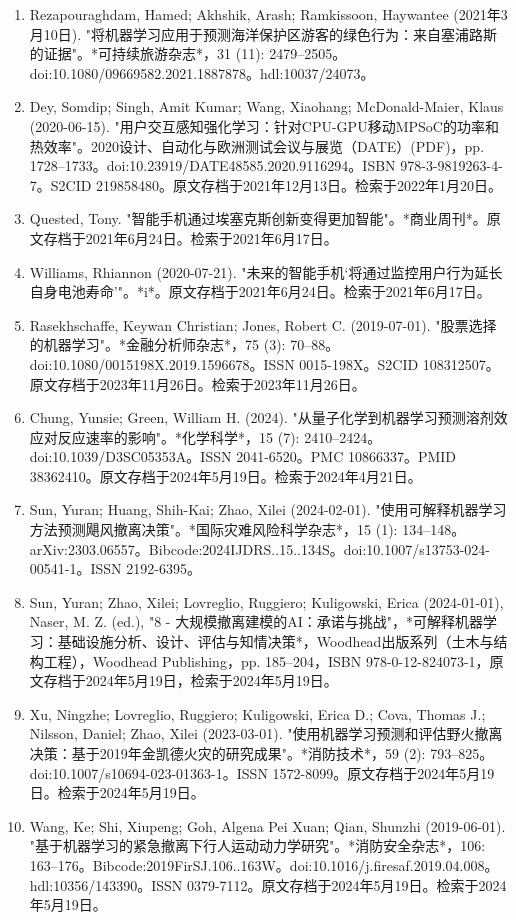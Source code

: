\begin{enumerate}
\item Rezapouraghdam, Hamed; Akhshik, Arash; Ramkissoon, Haywantee (2021年3月10日). "将机器学习应用于预测海洋保护区游客的绿色行为：来自塞浦路斯的证据"。*可持续旅游杂志*，31 (11): 2479–2505。doi:10.1080/09669582.2021.1887878。hdl:10037/24073。
\item Dey, Somdip; Singh, Amit Kumar; Wang, Xiaohang; McDonald-Maier, Klaus (2020-06-15). "用户交互感知强化学习：针对CPU-GPU移动MPSoC的功率和热效率"。2020设计、自动化与欧洲测试会议与展览（DATE）(PDF)，pp. 1728–1733。doi:10.23919/DATE48585.2020.9116294。ISBN 978-3-9819263-4-7。S2CID 219858480。原文存档于2021年12月13日。检索于2022年1月20日。
\item Quested, Tony. "智能手机通过埃塞克斯创新变得更加智能"。*商业周刊*。原文存档于2021年6月24日。检索于2021年6月17日。
\item Williams, Rhiannon (2020-07-21). "未来的智能手机‘将通过监控用户行为延长自身电池寿命’"。*i*。原文存档于2021年6月24日。检索于2021年6月17日。
\item Rasekhschaffe, Keywan Christian; Jones, Robert C. (2019-07-01). "股票选择的机器学习"。*金融分析师杂志*，75 (3): 70–88。doi:10.1080/0015198X.2019.1596678。ISSN 0015-198X。S2CID 108312507。原文存档于2023年11月26日。检索于2023年11月26日。
\item Chung, Yunsie; Green, William H. (2024). "从量子化学到机器学习预测溶剂效应对反应速率的影响"。*化学科学*，15 (7): 2410–2424。doi:10.1039/D3SC05353A。ISSN 2041-6520。PMC 10866337。PMID 38362410。原文存档于2024年5月19日。检索于2024年4月21日。
\item Sun, Yuran; Huang, Shih-Kai; Zhao, Xilei (2024-02-01). "使用可解释机器学习方法预测飓风撤离决策"。*国际灾难风险科学杂志*，15 (1): 134–148。arXiv:2303.06557。Bibcode:2024IJDRS..15..134S。doi:10.1007/s13753-024-00541-1。ISSN 2192-6395。
\item Sun, Yuran; Zhao, Xilei; Lovreglio, Ruggiero; Kuligowski, Erica (2024-01-01), Naser, M. Z. (ed.), "8 - 大规模撤离建模的AI：承诺与挑战"，*可解释机器学习：基础设施分析、设计、评估与知情决策*，Woodhead出版系列（土木与结构工程），Woodhead Publishing，pp. 185–204，ISBN 978-0-12-824073-1，原文存档于2024年5月19日，检索于2024年5月19日。
\item Xu, Ningzhe; Lovreglio, Ruggiero; Kuligowski, Erica D.; Cova, Thomas J.; Nilsson, Daniel; Zhao, Xilei (2023-03-01). "使用机器学习预测和评估野火撤离决策：基于2019年金凯德火灾的研究成果"。*消防技术*，59 (2): 793–825。doi:10.1007/s10694-023-01363-1。ISSN 1572-8099。原文存档于2024年5月19日。检索于2024年5月19日。
\item Wang, Ke; Shi, Xiupeng; Goh, Algena Pei Xuan; Qian, Shunzhi (2019-06-01). "基于机器学习的紧急撤离下行人运动动力学研究"。*消防安全杂志*，106: 163–176。Bibcode:2019FirSJ.106..163W。doi:10.1016/j.firesaf.2019.04.008。hdl:10356/143390。ISSN 0379-7112。原文存档于2024年5月19日。检索于2024年5月19日。

\end{enumerate}
